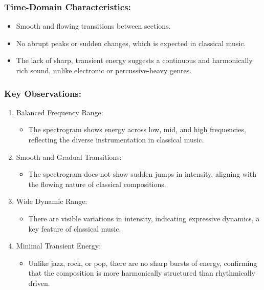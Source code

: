 \documentclass[a4paper,12pt]{article}
\begin{document}
\subsubsection{Time-Domain Characteristics:}
\begin{itemize}
    \item Smooth and flowing transitions between sections.
    \item No abrupt peaks or sudden changes, which is expected in classical music.
    \item The lack of sharp, transient energy suggests a continuous and harmonically rich sound, unlike electronic or percussive-heavy genres.

\end{itemize}
\subsubsection{Key Observations:}

\begin{enumerate}
    \item Balanced Frequency Range:
        \begin{itemize}
            \item The spectrogram shows energy across low, mid, and high frequencies, reflecting the diverse instrumentation in classical music.  
        \end{itemize}
    \item Smooth and Gradual Transitions:
        \begin{itemize}
            \item The spectrogram does not show sudden jumps in intensity, aligning with the flowing nature of classical compositions.
        \end{itemize}
    \item Wide Dynamic Range:
        \begin{itemize}
            \item There are visible variations in intensity, indicating expressive dynamics, a key feature of classical music.  
        \end{itemize}
    \item Minimal Transient Energy:
        \begin{itemize}
            \item Unlike jazz, rock, or pop, there are no sharp bursts of energy, confirming that the composition is more harmonically structured than rhythmically driven.
        \end{itemize}
\end{enumerate}
\end{document}
